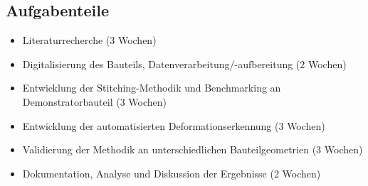 \documentclass[../main.tex]{subfiles}
\begin{document}
\subsection*{Aufgabenteile}

\begin{itemize}
    \item Literaturrecherche (3 Wochen)
    \item Digitalisierung des Bauteils, Datenverarbeitung/-aufbereitung (2 Wochen)
    \item Entwicklung der Stitching-Methodik und Benchmarking an Demonstratorbauteil (3 Wochen)
    \item Entwicklung der automatisierten Deformationserkennung (3 Wochen)
    \item Validierung der Methodik an unterschiedlichen Bauteilgeometrien (3 Wochen)
    \item Dokumentation, Analyse und Diskussion der Ergebnisse (2 Wochen)
\end{itemize}
\end{document}
